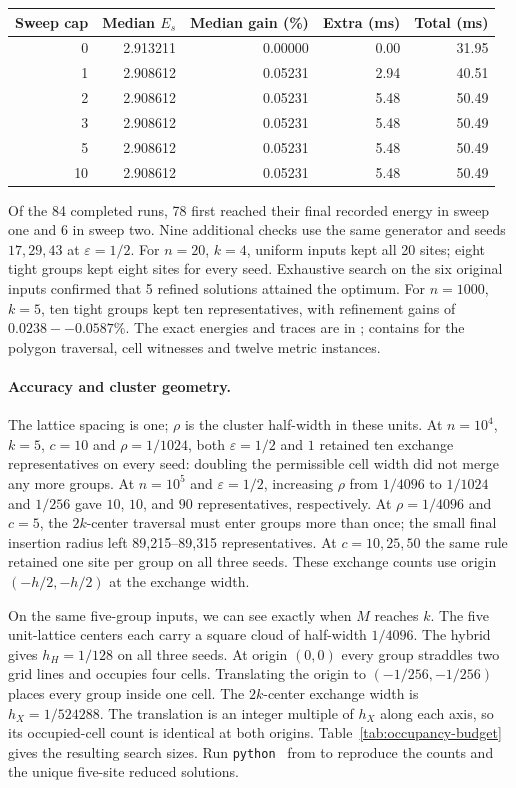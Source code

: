 \documentclass[a4paper,12pt]{article}
\numberwithin{equation}{section}
\begin{document}
\begin{center}\small
\begin{tabular}{rrrrr}\toprule
Sweep cap & Median $E_s$ & Median gain (\%) & Extra (ms) & Total (ms)\\\midrule
0 & 2.913211 & 0.00000 & 0.00 & 31.95\\
1 & 2.908612 & 0.05231 & 2.94 & 40.51\\
2 & 2.908612 & 0.05231 & 5.48 & 50.49\\
3 & 2.908612 & 0.05231 & 5.48 & 50.49\\
5 & 2.908612 & 0.05231 & 5.48 & 50.49\\
10 & 2.908612 & 0.05231 & 5.48 & 50.49\\
\bottomrule\end{tabular}\end{center}
Of the 84 completed runs, 78 first reached their final recorded energy in sweep one and 6 in sweep
two. Nine additional checks use the same generator and seeds $17,29,43$ at $\varepsilon=1/2$. For
$n=20$, $k=4$, uniform inputs kept all 20 sites; eight tight groups kept eight sites for every
seed. Exhaustive search on the six original inputs confirmed that 5 refined solutions attained the
optimum. For $n=1000$, $k=5$, ten tight groups kept ten representatives, with refinement gains of
$0.0238--0.0587\%$. The exact energies and traces are in ;
 contains  for the polygon traversal, cell
witnesses and twelve metric instances.

\paragraph{Accuracy and cluster geometry.}
The lattice spacing is one; $\rho$ is the cluster half-width in these units. At $n=10^4$, $k=5$,
$c=10$ and $\rho=1/1024$, both $\varepsilon=1/2$ and $1$ retained ten exchange representatives on
every seed: doubling the permissible cell width did not merge any more groups. At $n=10^5$ and
$\varepsilon=1/2$, increasing $\rho$ from $1/4096$ to $1/1024$ and $1/256$ gave $10$, $10$, and
$90$ representatives, respectively. At $\rho=1/4096$ and $c=5$, the $2k$-center traversal must
enter groups more than once; the small final insertion radius left 89{,}215--89{,}315
representatives. At $c=10,25,50$ the same rule retained one site per group on all three seeds.
These exchange counts use origin $(-h/2,-h/2)$ at the exchange width.

On the same five-group inputs, we can see exactly when $M$ reaches $k$. The five unit-lattice
centers each carry a square cloud of half-width $1/4096$. The hybrid gives $h_H=1/128$ on all
three seeds. At origin $(0,0)$ every group straddles two grid lines and occupies four cells.
Translating the origin to $(-1/256,-1/256)$ places every group inside one cell. The $2k$-center
exchange width is $h_X=1/524288$. The translation is an integer multiple of $h_X$ along each axis,
so its occupied-cell count is identical at both origins. Table~\ref{tab:occupancy-budget} gives
the resulting search sizes. Run \texttt{python}\  from
 to reproduce the counts and the unique five-site reduced solutions.
\end{document}
